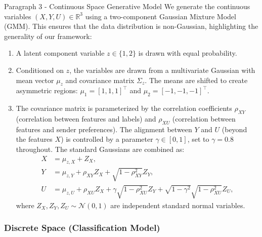 \begin{sourceblock}{Paragraph 3 - Continuous Space Generative Model}
We generate the continuous variables $(X, Y, U) \in \mathbb{R}^3$ using a two-component Gaussian Mixture Model (GMM). This ensures that the data distribution is non-Gaussian, highlighting the generality of our framework:
\begin{enumerate}
    \item A latent component variable $z \in \{1, 2\}$ is drawn with equal probability.
    \item Conditioned on $z$, the variables are drawn from a multivariate Gaussian with mean vector $\mu_z$ and covariance matrix $\Sigma_z$. The means are shifted to create asymmetric regions: $\mu_1 = [1, 1, 1]^\top$ and $\mu_2 = [-1, -1, -1]^\top$.
    \item The covariance matrix is parameterized by the correlation coefficients $\rho_{XY}$ (correlation between features and labels) and $\rho_{XU}$ (correlation between features and sender preferences). The alignment between $Y$ and $U$ (beyond the features $X$) is controlled by a parameter $\gamma \in [0, 1]$, set to $\gamma = 0.8$ throughout. The standard Gaussians are combined as:
    \begin{align}
        X &= \mu_{z, X} + Z_X, \\
        Y &= \mu_{z, Y} + \rho_{XY} Z_X + \sqrt{1 - \rho_{XY}^2} Z_Y, \\
        U &= \mu_{z, U} + \rho_{XU} Z_X + \gamma \sqrt{1 - \rho_{XU}^2} Z_Y + \sqrt{1 - \gamma^2} \sqrt{1 - \rho_{XU}^2} Z_U,
    \end{align}
    where $Z_X, Z_Y, Z_U \sim \mathcal{N}(0, 1)$ are independent standard normal variables.
\end{enumerate}
\end{sourceblock}

\begin{faqblock}
\faqanswers
{}
\end{faqblock}

\subsubsection{Discrete Space (Classification Model)}


